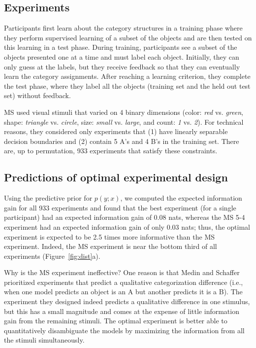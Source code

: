 \documentclass{article}
\begin{document}
\subsection{Experiments}

Participants first learn about the category structures in a training phase where they perform supervised learning of a subset of the objects and are then tested on this learning in a test phase.
During training, participants see a subset of the objects presented one at a time and must label each object.
Initially, they can only guess at the labels, but they receive feedback so that they can eventually learn the category assignments.
After reaching a learning criterion, they complete the test phase, where they label all the objects (training set and the held out test set) without feedback.

MS used visual stimuli that varied on 4 binary dimensions (color: \emph{red} vs. \emph{green}, shape: \emph{triangle} vs. \emph{circle}, size: \emph{small} vs. \emph{large}, and count: \emph{1} vs. \emph{2}).
For technical reasons, they considered only experiments that (1) have linearly separable decision boundaries and (2) contain 5 A's and 4 B's in the training set.
There are, up to permutation, 933 experiments that satisfy these constraints.

\subsection{Predictions of optimal experimental design}

Using the predictive prior for $p(y; x)$, we computed the expected information gain for all 933 experiments and found that the best experiment (for a single participant) had an expected information gain of 0.08 nats, whereas the MS 5-4 experiment had an expected information gain of only 0.03 nats; thus, the optimal experiment is expected to be 2.5 times more informative than the MS experiment.
Indeed, the MS experiment is near the bottom third of all experiments (Figure~\ref{fig:dist}a).

Why is the MS experiment ineffective?
One reason is that Medin and Schaffer prioritized experiments that predict a qualitative categorization difference (i.e., when one model predicts an object is an A  but another predicts it is a B).
The experiment they designed indeed predicts a qualitative difference in one stimulus, but this has a small magnitude and comes at the expense of little information gain from the remaining stimuli.
The optimal experiment is better able to quantitatively disambiguate the models by maximizing the information from all the stimuli simultaneously.
\end{document}
